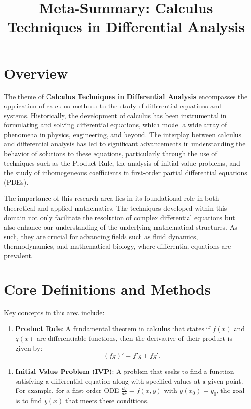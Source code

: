 \documentclass[11pt,a4paper]{article}
\title{Meta-Summary: Calculus Techniques in Differential Analysis}
\date{}
\begin{document}
\maketitle

\section{Overview}

The theme of \textbf{Calculus Techniques in Differential Analysis} encompasses the application of calculus methods to the study of differential equations and systems. Historically, the development of calculus has been instrumental in formulating and solving differential equations, which model a wide array of phenomena in physics, engineering, and beyond. The interplay between calculus and differential analysis has led to significant advancements in understanding the behavior of solutions to these equations, particularly through the use of techniques such as the Product Rule, the analysis of initial value problems, and the study of inhomogeneous coefficients in first-order partial differential equations (PDEs).

The importance of this research area lies in its foundational role in both theoretical and applied mathematics. The techniques developed within this domain not only facilitate the resolution of complex differential equations but also enhance our understanding of the underlying mathematical structures. As such, they are crucial for advancing fields such as fluid dynamics, thermodynamics, and mathematical biology, where differential equations are prevalent.

\section{Core Definitions and Methods}

Key concepts in this area include:

\begin{enumerate}
\item \textbf{Product Rule}: A fundamental theorem in calculus that states if \( f(x) \) and \( g(x) \) are differentiable functions, then the derivative of their product is given by:
\[
(fg)' = f'g + fg'.
\]
\end{enumerate}

\begin{enumerate}
\item \textbf{Initial Value Problem (IVP)}: A problem that seeks to find a function satisfying a differential equation along with specified values at a given point. For example, for a first-order ODE \( \frac{dy}{dx} = f(x, y) \) with \( y(x_0) = y_0 \), the goal is to find \( y(x) \) that meets these conditions.
\end{enumerate}
\end{document}
